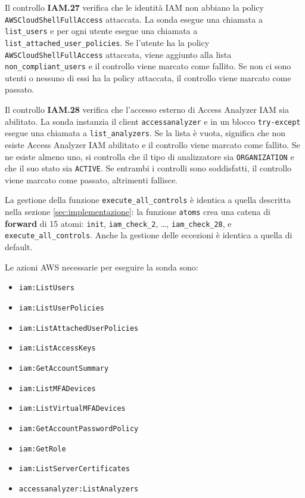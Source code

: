 Il controllo \textbf{IAM.27} verifica che le identità IAM non abbiano la policy \texttt{AWSCloudShellFullAccess} attaccata. La sonda esegue una chiamata a \texttt{list\_users} e per ogni utente esegue una chiamata a \texttt{list\_attached\_user\_policies}. Se l'utente ha la policy \texttt{AWSCloudShellFullAccess} attaccata, viene aggiunto alla lista \texttt{non\_compliant\_users} e il controllo viene marcato come fallito. Se non ci sono utenti o nessuno di essi ha la policy attaccata, il controllo viene marcato come passato.

Il controllo \textbf{IAM.28} verifica che l'accesso esterno di Access Analyzer IAM sia abilitato. La sonda instanzia il client \texttt{accessanalyzer} e in un blocco \texttt{try-except} esegue una chiamata a \texttt{list\_analyzers}. Se la lista è vuota, significa che non esiste Access Analyzer IAM abilitato e il controllo viene marcato come fallito. Se ne esiste almeno uno, si controlla che il tipo di analizzatore sia \texttt{ORGANIZATION} e che il suo stato sia \texttt{ACTIVE}. Se entrambi i controlli sono soddisfatti, il controllo viene marcato come passato, altrimenti fallisce.

La gestione della funzione \texttt{execute\_all\_controls} è identica a quella descritta nella sezione \ref{sec:implementazione}: la funzione \texttt{atoms} crea una catena di \textbf{forward} di 15 atomi: \texttt{init}, \texttt{iam\_check\_2}, \dots, \texttt{iam\_check\_28}, e \texttt{execute\_all\_controls}. Anche la gestione delle eccezioni è identica a quella di default.

Le azioni AWS necessarie per eseguire la sonda sono:
\begin{itemize}
    \item \texttt{iam:ListUsers}
    \item \texttt{iam:ListUserPolicies}
    \item \texttt{iam:ListAttachedUserPolicies}
    \item \texttt{iam:ListAccessKeys}
    \item \texttt{iam:GetAccountSummary}
    \item \texttt{iam:ListMFADevices}
    \item \texttt{iam:ListVirtualMFADevices}
    \item \texttt{iam:GetAccountPasswordPolicy}
    \item \texttt{iam:GetRole}
    \item \texttt{iam:ListServerCertificates}
    \item \texttt{accessanalyzer:ListAnalyzers}
\end{itemize}

